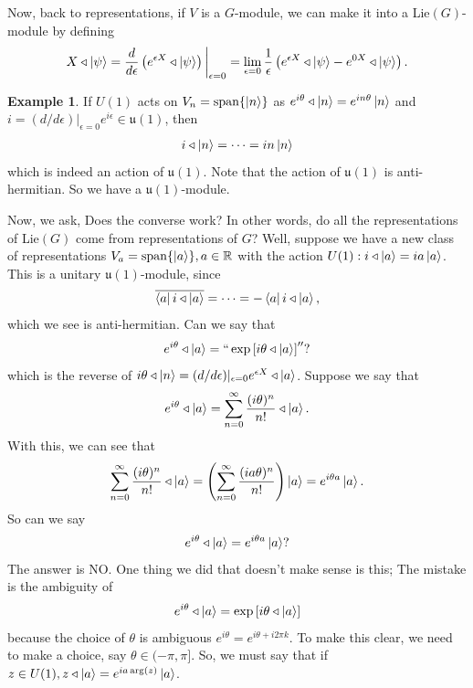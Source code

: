 \documentclass{book}
\theoremstyle{definition}
\newtheorem{exmp}{Example}[section]
\newcommand{\R}{\mathbb{R}}
\newcommand{\ep}{\epsilon}
\newcommand{\f}[2]{\frac{#1}{#2}}
\newcommand{\lp}{\left(}
\newcommand{\rp}{\right)}
\newcommand{\lb}{\left[}
\newcommand{\rb}{\right]}
\begin{document}
Now, back to representations, if $V$ is a $G$-module, we can make it into a Lie$(G)$-module by defining 
\begin{align}
X \triangleleft \ket{\psi} = \f{d}{d\ep}\lp e^{\ep X} \triangleleft\ket{\psi} \rp\bigg\vert_{\ep=0} = \lim_{\ep=0}\f{1}{\ep}\lp e^{\ep X}\triangleleft\ket{\psi} - e^{0X}\triangleleft\ket{\psi} \rp.
\end{align}


\begin{exmp}
	If $U(1)$ acts on $V_n = \text{span}\{ \ket{n}   \}$ as $e^{i\theta}\triangleleft\ket{n} = e^{in\theta}\ket{n}$ and $i = (d/d\ep)\vert_{\ep=0} e^{i\ep} \in \mathfrak{u}(1)$, then 
	\begin{align}
	i\triangleleft\ket{n} = \dots = in\ket{n}
	\end{align}
	which is indeed an action of $\mathfrak{u}(1)$. Note that the action of $\mathfrak{u}(1)$ is anti-hermitian. So we have a $\mathfrak{u}(1)$-module.
\end{exmp}







Now, we ask, Does the converse work? In other words, do all the representations of Lie$(G)$ come from representations of $G$? Well, suppose we have a new class of representations $V_a = \text{span}\{ \ket{a} \}, a \in \R$ with the action $U(1): i\triangleleft\ket{a} = ia\ket{a}$. This is a unitary $\mathfrak{u}(1)$-module, since
\begin{align}
\overline{\bra{a} i\triangleleft\ket{a} } = \dots = -\bra{a}i\triangleleft\ket{a},
\end{align} 
which we see is anti-hermitian. Can we say that 
\begin{align}
e^{i\theta} \triangleleft\ket{a} = ``\exp\lb i\theta \triangleleft \ket{a} \rb''?
\end{align}
which is the reverse of $i\theta \triangleleft \ket{n} = (d/d\ep)\vert_{\ep=0} e^{\ep X}\triangleleft \ket{a} $. Suppose we say that 
\begin{align}
e^{i\theta}\triangleleft\ket{a} = \sum^\infty_{n=0} \f{(i\theta)^n}{n!} \triangleleft \ket{a}.
\end{align}
With this, we can see that
\begin{align}
\sum^\infty_{n=0} \f{(i\theta)^n}{n!} \triangleleft \ket{a} = \lp \sum^\infty_{n=0} \f{(i a \theta)^n}{n!} \rp \ket{a} = e^{i\theta a}\ket{a}.
\end{align}
So can we say
\begin{align}
e^{i\theta}\triangleleft \ket{a} = e^{i\theta a}\ket{a}?
\end{align}
The answer is NO. One thing we did that doesn't make sense is this; The mistake is the ambiguity of 
\begin{align}
e^{i\theta} \triangleleft\ket{a} = \exp\lb i\theta \triangleleft \ket{a} \rb
\end{align}
because the choice of $\theta$ is ambiguous $e^{i\theta} = e^{i\theta + i 2\pi k}$. To make this clear, we need to make a choice, say $\theta \in (-\pi, \pi]$. So, we must say that if $z\in U(1), z\triangleleft \ket{a} = e^{ia \arg(z)}\ket{a}$. \\
\end{document}
